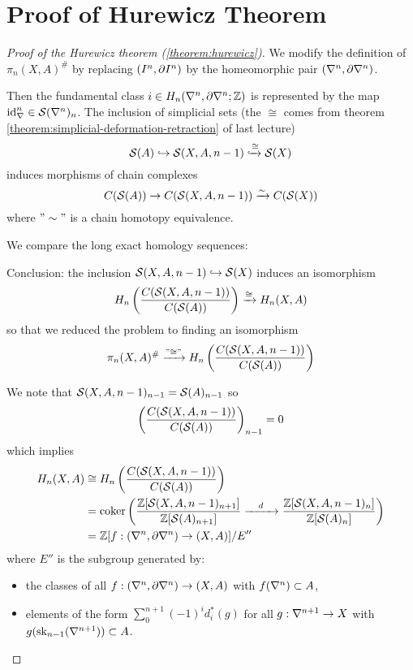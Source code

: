 
\section{Proof of Hurewicz Theorem}


\begin{proof}[Proof of the Hurewicz theorem (\ref{theorem:hurewicz})]
We modify the definition of $\pi_n(X,A)^\#$ by replacing $\pair$ by the homeomorphic pair $(\ns,\de\ns)$.

Then the fundamental class $i\in H_n(\ns,\de\ns;\Z)$ is represented by the map $\id_\ns\in\S(\ns)_n$. The inclusion of simplicial sets (the $\cong$ comes from theorem \ref{theorem:simplicial-deformation-retraction} of last lecture)
\[\S(A)\into\S(X,A,n-1)\xinto{\cong}\S(X)\]
induces morphisms of chain complexes
\[C(\S(A))\to C(\S(X,A,n-1))\xto{\sim}C(\S(X))\]
where $"\sim"$ is a chain homotopy equivalence.

We compare the long exact homology sequences:
\begin{center}
    \small
\end{center}

Conclusion: the inclusion $\S(X,A,n-1)\into\S(X)$ induces an isomorphism
\[H_n\left(\frac{C(\S(X,A,n-1))}{C(\S(A))}\right)\xto{\cong} H_n(X,A)\]
so that we reduced the problem to finding an isomorphism
\[\pi_n(X,A)^\#\xto{"\cong"} H_n\left(\frac{C(\S(X,A,n-1))}{C(\S(A))}\right)\]

We note that $\S(X,A,\ni)_\ni=\S(A)_\ni$ so
\[\left(\frac{C(\S(X,A,n-1))}{C(\S(A))}\right)_\ni=0\]
which implies
\begin{align*}
    H_n(X,A)&\cong H_n\left(\frac{C(\S(X,A,n-1))}{C(\S(A))}\right) \\
    &=\coker\left(\frac{\Z[\S(X,A,\ni)_{n+1}]}{\Z[\S(A)_{n+1}]}\xto{\quad d\quad} \frac{\Z[\S(X,A,\ni)_n]}{\Z[\S(A)_n]}\right) \\
    &=\Z[f:(\ns,\de\ns)\to (X,A)]/E''
\end{align*}
where $E''$ is the subgroup generated by:
\begin{itemize}[label={-}]
    \item the classes of all $f:(\ns,\de\ns)\to(X,A)$ with $f(\ns)\subset A$,
    \item elements of the form $\sum_0^{n+1}(-1)^id_i^*(g)$ for all $g:\sx{n+1}\to X$ with $g(\sk_\ni(\sx{n+1}))\subset A$.
\end{itemize}


\end{proof}
